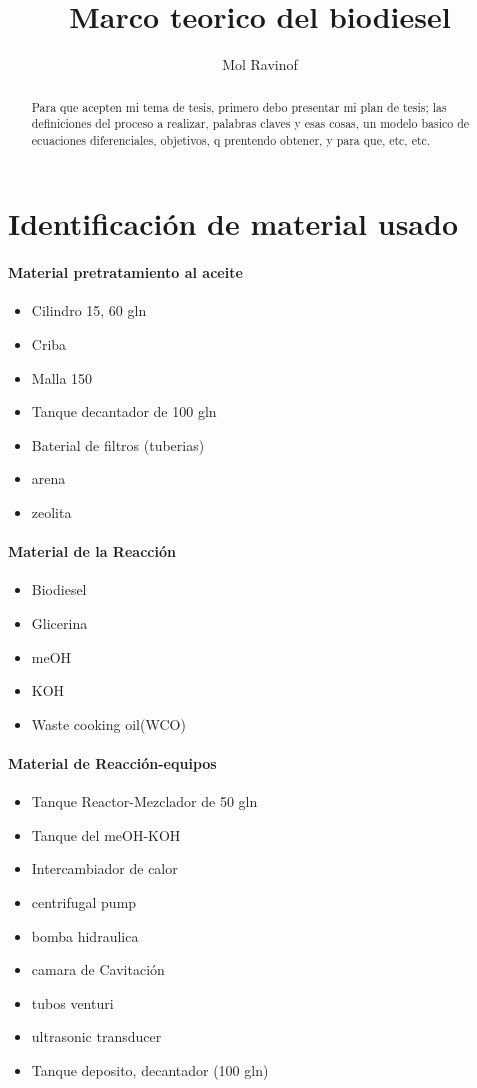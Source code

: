 \documentclass[a4paper,10pt]{article}
\title{Marco teorico del biodiesel}
\author{Mol Ravinof}
\begin{document}
\maketitle

\begin{abstract}
Para que acepten mi tema de tesis, primero debo presentar mi plan de tesis; las definiciones del proceso a realizar, palabras claves y esas cosas, un modelo basico de ecuaciones diferenciales, objetivos, q prentendo obtener, y para que, etc, etc.
\end{abstract}

\section{Identificación de material usado}
\paragraph{Material pretratamiento al aceite}
\begin{itemize}
 \item Cilindro 15, 60 gln
 \item Criba
 \item Malla 150
 \item Tanque decantador de 100 gln
 \item Baterial de filtros (tuberias)
 \item arena
 \item zeolita
\end{itemize}


\paragraph{Material de la Reacción}
\begin{itemize}
 \item Biodiesel
 \item Glicerina
 \item meOH
 \item KOH
 \item Waste cooking oil(WCO)
\end{itemize}
\paragraph{Material de Reacción-equipos}
\begin{itemize}
 \item Tanque Reactor-Mezclador de 50 gln
 \item Tanque del meOH-KOH
 \item Intercambiador de calor
 \item centrifugal pump
 \item bomba hidraulica
 \item camara de Cavitación
 \item tubos venturi
 \item ultrasonic transducer
 \item Tanque deposito, decantador (100 gln)
\end{itemize}
\end{document}
